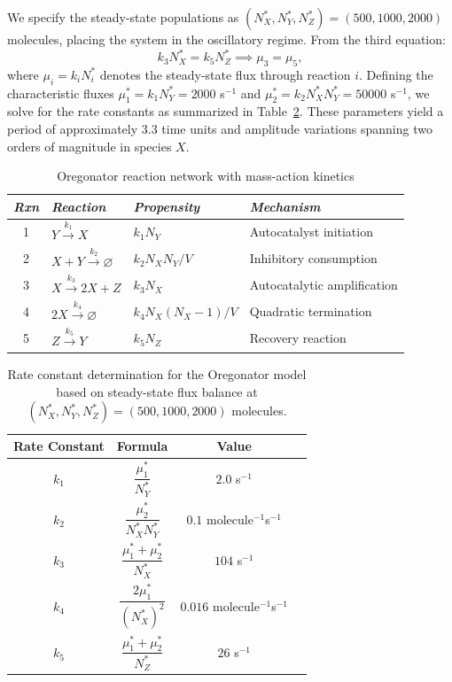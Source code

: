 \documentclass[review,onefignum,onetabnum]{siamart171218}
\begin{document}
We specify the steady-state populations as $(N_X^*, N_Y^*, N_Z^*) = (500, 1000, 2000)$ molecules, placing the system in the oscillatory regime. From the third equation:
\begin{equation}
k_3 N_X^* = k_5 N_Z^* \implies \mu_3 = \mu_5,
\end{equation}
where $\mu_i = k_i N_i^*$ denotes the steady-state flux through reaction $i$. Defining the characteristic fluxes $\mu_1^* = k_1 N_Y^* = 2000$ s$^{-1}$ and $\mu_2^* = k_2 N_X^* N_Y^* = 50000$ s$^{-1}$, we solve for the rate constants as summarized in Table~\ref{tab:oregonator_rates}. These parameters yield a period of approximately 3.3 time units and amplitude variations spanning two orders of magnitude in species $X$.
\begin{table}[!htbp]
\centering
\caption{Oregonator reaction network with mass-action kinetics}
\label{table:oregonator}
\begin{tabular}{|c|l|l|l|}
\hline
\textit{Rxn} & \textit{Reaction} & \textit{Propensity} & \textit{Mechanism}\\
\hline
1 & $Y \xrightarrow{k_1} X$ & $k_1 N_Y$ & Autocatalyst initiation \\
2 & $X + Y \xrightarrow{k_2} \varnothing$ & $k_2 N_X N_Y/V$ & Inhibitory consumption \\
3 & $X \xrightarrow{k_3} 2X + Z$ & $k_3 N_X$ & Autocatalytic amplification \\
4 & $2X \xrightarrow{k_4} \varnothing$ & $k_4 N_X(N_X-1)/V$ & Quadratic termination \\
5 & $Z \xrightarrow{k_5} Y$ & $k_5 N_Z$ & Recovery reaction \\
\hline
\end{tabular}
\end{table}
\begin{table}[h]
\centering
\caption{Rate constant determination for the Oregonator model based on steady-state flux balance at $(N_X^*, N_Y^*, N_Z^*) = (500, 1000, 2000)$ molecules.}
\label{tab:oregonator_rates}
\begin{tabular}{cccc}
\hline
Rate Constant & Formula  & Value \\
\hline
$k_1$ & $\dfrac{\mu_1^*}{N_Y^*}$ & $2.0$ s$^{-1}$ \\[0.3cm]
$k_2$ & $\dfrac{\mu_2^*}{N_X^* N_Y^*}$  & $0.1$ molecule$^{-1}$s$^{-1}$ \\[0.3cm]
$k_3$ & $\dfrac{\mu_1^* + \mu_2^*}{N_X^*}$ & $104$ s$^{-1}$ \\[0.3cm]
$k_4$ & $\dfrac{2\mu_1^*}{(N_X^*)^2}$  & $0.016$ molecule$^{-1}$s$^{-1}$ \\[0.3cm]
$k_5$ & $\dfrac{\mu_1^* + \mu_2^*}{N_Z^*}$  & $26$ s$^{-1}$ \\[0.3cm]
\hline
\end{tabular}
\end{table}
\end{document}
